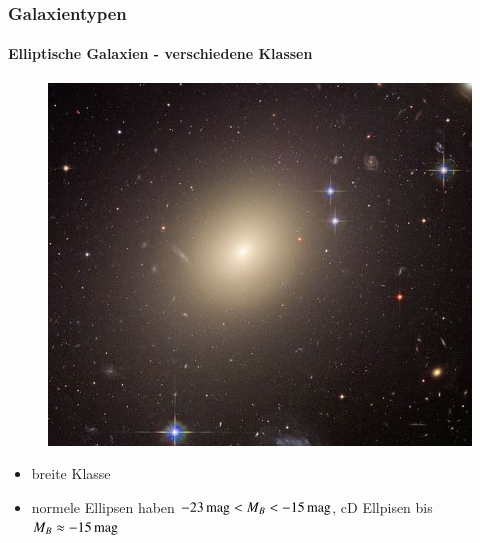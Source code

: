 \begin{frame}
\frametitle{Galaxientypen}
\framesubtitle{Elliptische Galaxien - verschiedene Klassen}

\begin{figure}
\includegraphics[scale=0.2]{Abell_Ellipise.jpg}
\end{figure}

\begin{itemize}
\item breite Klasse
\item normele Ellipsen haben $\unit[-23]{mag} < M_B < \unit[-15]{mag}$, cD Ellpisen bis $M_B \approx \unit[-15]{mag}$
\end{itemize}

\end{frame}


